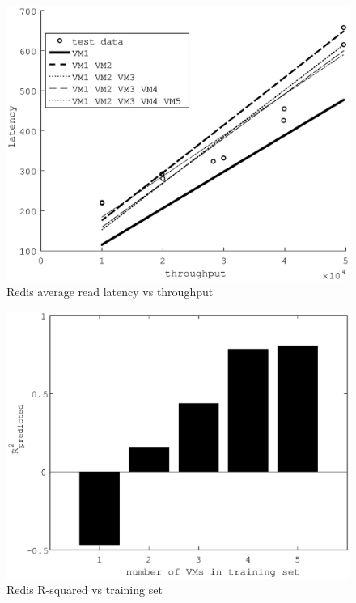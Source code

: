 \documentclass{acm_proc_article-sp}
\begin{document}
\begin{figure}
\centering
\includegraphics[scale = 0.5]{fit_read_avg_latency_r3_2x_r3__m3_2x_m3__r3_x_m3_x.eps}
\caption{Redis average read latency vs throughput}
\label{figure:redisbarread}
\end{figure}

\begin{figure}
\centering
\includegraphics[scale = 0.5]{bar_read_avg_latency_r3_x_r3_2x_m3_x_r3__m3_2x_m3_.eps}
\caption{Redis R-squared vs training set}
\label{figure:redisbarread}
\end{figure}
\end{document}
